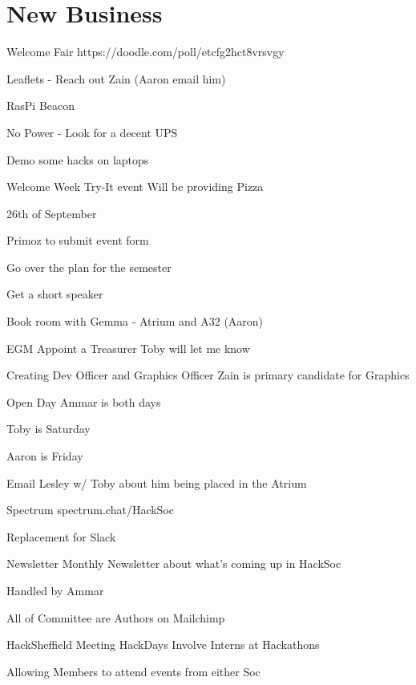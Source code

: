 \documentclass[11pt,hacksoc]{meetingmins}
\begin{document}
\section{New Business}
\begin{items}
	\item
	Welcome Fair
		\subitem
		https://doodle.com/poll/etcfg2hct8vrsvgy
		
		\subitem
		Leaflets - Reach out Zain (Aaron email him)
		
		\subitem
		RasPi Beacon
		
		\subitem
		No Power - Look for a decent UPS
		
		\subitem
		Demo some hacks on laptops
	
	\item
	Welcome Week
		\subitem
		Try-It event
			\subsubitem
			Will be providing Pizza
			
			\subsubitem
			26th of September
			
			\subsubitem
			Primoz to submit event form
			
			\subsubitem
			Go over the plan for the semester
			
			\subsubitem
			Get a short speaker
			
			\subsubitem
			Book room with Gemma - Atrium and A32 (Aaron)
			
	\item
	EGM
		\subitem
		Appoint a Treasurer
			\subsubitem
			Toby will let me know
		
		\subitem
		Creating Dev Officer and Graphics Officer
			\subsubitem
			Zain is primary candidate for Graphics
	
	\item
	Open Day
		\subitem
		Ammar is both days
		
		\subitem
		Toby is Saturday
		
		\subitem
		Aaron is Friday
		
		\subitem
		Email Lesley w/ Toby about him being placed in the Atrium
	
	\item
	Spectrum
		\subitem
		spectrum.chat/HackSoc
		
		\subitem
		Replacement for Slack
	
	\item
	Newsletter
		\subitem
		Monthly Newsletter about what's coming up in HackSoc
		
		\subitem
		Handled by Ammar
		
		\subitem
		All of Committee are Authors on Mailchimp
	
	\item
	HackSheffield Meeting
		\subitem
		HackDays
			\subsubitem
			Involve Interns at Hackathons
			
		\subitem
		Allowing Members to attend events from either Soc
	
\end{items}

\vspace{1em}
\end{document}
